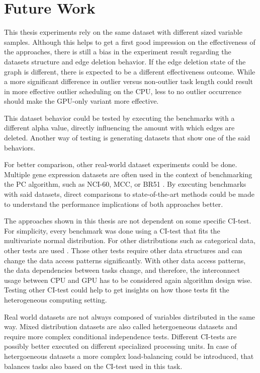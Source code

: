 \chapter{Future Work}
\label{chap:fuwork}
This thesis experiments rely on the same dataset with different sized variable samples. Although this helps to get a first good impression on the effectiveness of the approaches, there is still a bias in the experiment result regarding the datasets structure and edge deletion behavior. If the edge deletion state of the graph is different, there is expected to be a different effectiveness outcome. While a more significant difference in outlier versus non-outlier task length could result in more effective outlier scheduling on the CPU, less to no outlier occurrence should make the GPU-only variant more effective.

This dataset behavior could be tested by executing the benchmarks with a different alpha value, directly influencing the amount with which edges are deleted. Another way of testing is generating datasets that show one of the said behaviors.

For better comparison, other real-world dataset experiments could be done. Multiple gene expression datasets are often used in the context of benchmarking the PC algorithm, such as NCI-60, MCC, or BR51 \cite{leFastPCAlgorithm2019}. By executing benchmarks with said datasets, direct comparisons to state-of-the-art methods could be made to understand the performance implications of both approaches better.

The approaches shown in this thesis are not dependent on some specific CI-test. For simplicity, every benchmark was done using a CI-test that fits the multivariate normal distribution. For other distributions such as categorical data, other tests are used \cite{scutariLearningBayesianNetworks2010}. Those other tests require other data structures and can change the data access patterns significantly. With other data access patterns, the data dependencies between tasks change, and therefore, the interconnect usage between CPU and GPU has to be considered again algorithm design wise. Testing other CI-test could help to get insights on how those tests fit the heterogeneous computing setting.

Real world datasets are not always composed of variables distributed in the same way. Mixed distribution datasets are also called hetergoeneous datasets and require more complex conditional independence tests. Different CI-tests are possibly better executed on different specialized processing units. In case of hetergoeneous datasets a more complex load-balancing could be introduced, that balances tasks also based on the CI-test used in this task.

